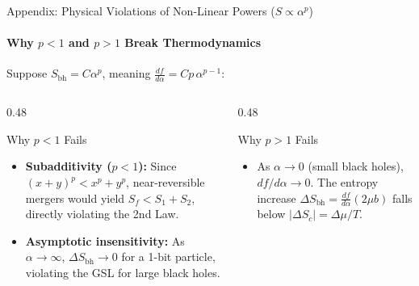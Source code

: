 \documentclass[aspectratio=169]{beamer}
\begin{document}
\begin{frame}{Appendix: Physical Violations of Non-Linear Powers ($S \propto \alpha^p$)}
\framesubtitle{Why $p < 1$ and $p > 1$ Break Thermodynamics}
Suppose $S_{\text{bh}} = C\alpha^p$, meaning $\frac{df}{d\alpha} = C p\,\alpha^{p-1}$:

\vspace{0.2cm}
\begin{columns}[T]
\begin{column}{0.48\textwidth}
\begin{block}{Why $p < 1$ Fails}
\begin{itemize}
  \item \textbf{Subadditivity ($p < 1$):} Since $(x+y)^p < x^p + y^p$, near-reversible mergers would yield $S_f < S_1 + S_2$, directly violating the 2nd Law.
  \item \textbf{Asymptotic insensitivity:} As $\alpha \to \infty$, $\Delta S_{\text{bh}} \to 0$ for a 1-bit particle, violating the GSL for large black holes.
\end{itemize}
\end{block}
\end{column}

\begin{column}{0.48\textwidth}
\begin{block}{Why $p > 1$ Fails}
\begin{itemize}
  \item As $\alpha \to 0$ (small black holes), $df/d\alpha \to 0$. The entropy increase $\Delta S_{\text{bh}} = \frac{df}{d\alpha}(2\mu b)$ falls below $|\Delta S_c| = \Delta\mu/T$.
\end{itemize}
\end{block}
\end{column}
\end{columns}
\end{frame}
\end{document}
